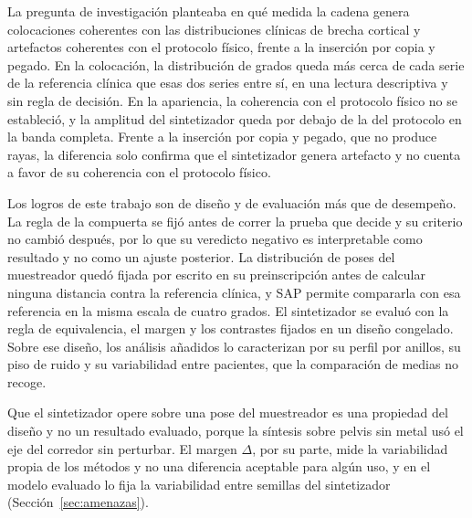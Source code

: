 La pregunta de investigación planteaba en qué medida la cadena genera colocaciones coherentes con las distribuciones clínicas de brecha cortical y artefactos coherentes con el protocolo físico, frente a la inserción por copia y pegado. En la colocación, la distribución de grados queda más cerca de cada serie de la referencia clínica que esas dos series entre sí, en una lectura descriptiva y sin regla de decisión. En la apariencia, la coherencia con el protocolo físico no se estableció, y la amplitud del sintetizador queda por debajo de la del protocolo en la banda completa. Frente a la inserción por copia y pegado, que no produce rayas, la diferencia solo confirma que el sintetizador genera artefacto y no cuenta a favor de su coherencia con el protocolo físico.


Los logros de este trabajo son de diseño y de evaluación más que de desempeño. La regla de la compuerta se fijó antes de correr la prueba que decide y su criterio no cambió después, por lo que su veredicto negativo es interpretable como resultado y no como un ajuste posterior. La distribución de poses del muestreador quedó fijada por escrito en su preinscripción antes de calcular ninguna distancia contra la referencia clínica, y SAP permite compararla con esa referencia en la misma escala de cuatro grados. El sintetizador se evaluó con la regla de equivalencia, el margen y los contrastes fijados en un diseño congelado. Sobre ese diseño, los análisis añadidos lo caracterizan por su perfil por anillos, su piso de ruido y su variabilidad entre pacientes, que la comparación de medias no recoge.

  Que el sintetizador opere sobre una pose del muestreador es una propiedad del diseño y no un resultado evaluado, porque la síntesis sobre pelvis sin metal usó el eje del corredor sin perturbar. El margen $\Delta$, por su parte, mide la variabilidad propia de los métodos y no una diferencia aceptable para algún uso, y en el modelo evaluado lo fija la variabilidad entre semillas del sintetizador (Sección~\ref{sec:amenazas}).


